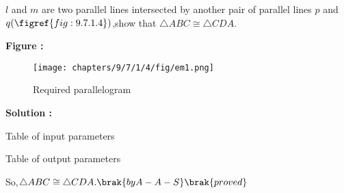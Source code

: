 $l$ and $m$ are two parallel lines intersected by another pair of parallel lines $p$ and $q (\figref{fig:9.7.1.4})$,show that $\triangle ABC \cong \triangle CDA$.

\textbf{Figure :}
\begin{figure}[H]
    \centering
	\texttt{[image: chapters/9/7/1/4/fig/em1.png]}
    \caption{Required parallelogram}
    \label{fig:9.7.1.4}
\end{figure}

\textbf{Solution :}
\begin{table}[H]
    \centering
    
    \caption{Table of input parameters}
    \label{tab:9.7.1.4.1}
\end{table}

\begin{table}[H]
    \centering
    
    \caption{Table of output parameters}
    \label{tab:9.7.1.4.2}
\end{table}  
So,$\triangle ABC \cong \triangle CDA.\brak{by A-A-S}\brak{proved}$

